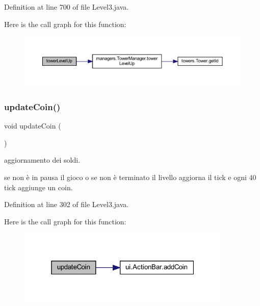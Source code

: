 Definition at line 700 of file Level3.\+java.

Here is the call graph for this function\+:
\nopagebreak
\begin{figure}[H]
\begin{center}
\leavevmode
\includegraphics[width=350pt]{classscenes_1_1_level3_a8a3c715fcfd3d65e1d8241a1fa4965ff_cgraph}
\end{center}
\end{figure}
\mbox{\label{classscenes_1_1_level3_a7ca93fcd8c7440e7b3f64c595a5be28c}} 
\subsubsection{\texorpdfstring{update\+Coin()}{updateCoin()}}
{\footnotesize\ttfamily void update\+Coin (\begin{DoxyParamCaption}{ }\end{DoxyParamCaption})}



aggiornamento dei soldi. 

se non è in pausa il gioco o se non è terminato il livello aggiorna il tick e ogni 40 tick aggiunge un coin. 

Definition at line 302 of file Level3.\+java.

Here is the call graph for this function\+:\nopagebreak
\begin{figure}[H]
\begin{center}
\leavevmode
\includegraphics[width=289pt]{classscenes_1_1_level3_a7ca93fcd8c7440e7b3f64c595a5be28c_cgraph}
\end{center}
\end{figure}
\mbox{\label{classscenes_1_1_level3_af005ec68c869a6acd5e833cba9330a50}} 
